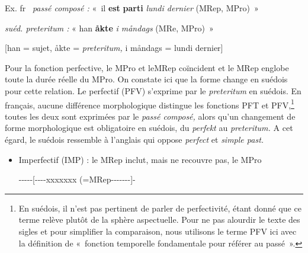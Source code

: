 \documentclass[french, output=paper]{langscibook}
\begin{document}
\begin{otherlanguage}{french}
\begin{itemize}
Ex. fr~ \textit{passé composé :} «\textit{~}il \textbf{est} \textbf{parti} \textit{lundi dernier} (MRep, MPro)~»



 \textit{suéd. preteritum :} « han \textbf{åkte} \textit{i m}{\textit{å}}\textit{ndags} (MRe, MPro)~» 



[han = sujet, åkte = \textit{preteritum,} i m{å}ndags = lundi dernier]
\end{itemize}

Pour la fonction perfective, le MPro et leMRep  coïncident et le MRep englobe toute la durée réelle du MPro. On constate ici que la forme change en suédois pour cette relation. Le perfectif (PFV) s’exprime par le \textit{preteritum} en suédois. En français, aucune différence morphologique distingue les fonctions PFT et PFV,\footnote{En suédois, il n’est pas pertinent de parler de perfectivité, étant donné que ce terme relève plutôt de la sphère aspectuelle. Pour ne pas alourdir le texte des sigles et pour simplifier la comparaison, nous utilisons le terme PFV ici avec la définition de «~fonction temporelle fondamentale pour référer au passé~».} toutes les deux sont exprimées par le \textit{passé composé,} alors qu’un changement de forme morphologique est obligatoire en suédois, du \textit{perfekt} au \textit{preteritum.} A cet égard, le suédois ressemble à l’anglais qui oppose \textit{perfect} et \textit{simple past.} 

\begin{itemize}
\item 
Imperfectif  (IMP) : le MRep inclut, mais ne recouvre pas, le MPro  

{}-{}-{}-{}-{}-[-{}-{}-{}-xxxxxxx (=MRep-{}-{}-{}-{}-{}-{}-]-     

\end{itemize}


\end{otherlanguage}
\end{document}
